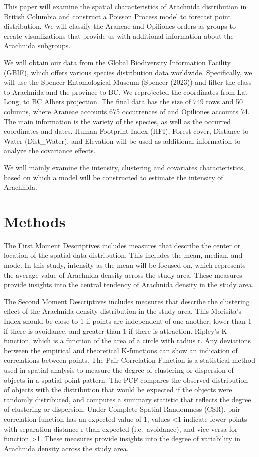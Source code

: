 \documentclass{article}
\begin{document}
This paper will examine the spatial characteristics of Arachnida
distribution in British Columbia and construct a Poisson Process model
to forecast point distribution. We will classify the Araneae and
Opiliones orders as groups to create visualizations that provide us with
additional information about the Arachnida subgroups.

We will obtain our data from the Global Biodiversity Information
Facility (GBIF), which offers various species distribution data
worldwide. Specifically, we will use the Spencer Entomological Museum
(Spencer (2023)) and filter the class to Arachnida and the province to
BC. We reprojected the coordinates from Lat Long, to BC Albers
projection. The final data has the size of 749 rows and 50 columns,
where Araneae accounts 675 occurrences of and Opiliones accounts 74. The
main information is the variety of the species, as well as the occurred
coordinates and dates. Human Footprint Index (HFI), Forest cover,
Distance to Water (Dist\_Water), and Elevation will be used as
additional information to analyze the covariance effects.

We will mainly examine the intensity, clustering and covariates
characteristics, based on which a model will be constructed to estimate
the intensity of Arachnida.

\hypertarget{methods}{%
\section*{Methods}\label{methods}}

The First Moment Descriptives includes measures that describe the center
or location of the spatial data distribution. This includes the mean,
median, and mode. In this study, intensity as the mean will be focused
on, which represents the average value of Arachnida density across the
study area. These measures provide insights into the central tendency of
Arachnida density in the study area.

The Second Moment Descriptives includes measures that describe the
clustering effect of the Arachnida density distribution in the study
area. This Morisita's Index should be close to 1 if points are
independent of one another, lower than 1 if there is avoidance, and
greater than 1 if there is attraction. Ripley's K function, which is a
function of the area of a circle with radius r. Any deviations between
the empirical and theoretical K-functions can show an indication of
correlations between points. The Pair Correlation Function is a
statistical method used in spatial analysis to measure the degree of
clustering or dispersion of objects in a spatial point pattern. The PCF
compares the observed distribution of objects with the distribution that
would be expected if the objects were randomly distributed, and computes
a summary statistic that reflects the degree of clustering or
dispersion. Under Complete Spatial Randomness (CSR), pair correlation
function has an expected value of 1, values \textless1 indicate fewer
points with separation distance r than expected (i.e.~avoidance), and
vice versa for function \textgreater1. These measures provide insights
into the degree of variability in Arachnida density across the study
area.
\end{document}
